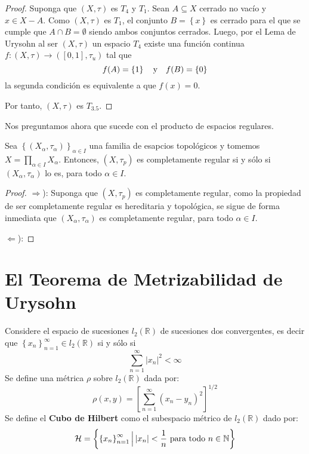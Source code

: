 \documentclass[12pt]{report}
\theoremstyle{largebreak}
\newcommand\abs[1]{\ensuremath{\left|#1\right|}}
\newcommand\cf[3]{\ensuremath{#1:#2\rightarrow#3}}
\begin{document}
    \begin{proof}
        Suponga que $(X,\tau)$ es $T_4$ y $T_1$. Sean $A\subseteq X$ cerrado no vacío y $x\in X-A$. Como $(X,\tau)$ es $T_1$, el conjunto $B=\left\{x \right\}$ es cerrado para el que se cumple que $A\cap B=\emptyset$ siendo ambos conjuntos cerrados. Luego, por el Lema de Urysohn al ser $(X,\tau)$ un espacio $T_4$ existe una función continua $\cf{f}{(X,\tau)}{([0,1],\tau_u)}$ tal que
        \begin{equation*}
            f(A)=\left\{1 \right\}\quad\textup{y}\quad f(B)=\left\{0 \right\}
        \end{equation*}
        la segunda condición es equivalente a que $f(x)=0$.

        Por tanto, $(X,\tau)$ es $T_{3.5}$.
    \end{proof}

    Nos preguntamos ahora que sucede con el producto de espacios regulares.

    \begin{propo}
        Sea $\left\{(X_\alpha,\tau_\alpha) \right\}_{ \alpha\in I}$ una familia de esapcios topológicos y tomemos $X=\prod_{ \alpha\in I}X_\alpha$. Entonces, $(X,\tau_p)$ es completamente regular si y sólo si $(X_\alpha,\tau_\alpha)$ lo es, para todo $\alpha\in I$.
    \end{propo}

    \begin{proof}
        $\Rightarrow$): Suponga que $(X,\tau_p)$ es completamente regular, como la propiedad de ser completamente regular es hereditaria y topológica, se sigue de forma inmediata que $(X_\alpha,\tau_\alpha)$ es completamente regular, para todo $\alpha\in I$.

        $\Leftarrow$): 
    \end{proof}

    \section{El Teorema de Metrizabilidad de Urysohn}

    \begin{mydef}
        Considere el espacio de sucesiones $l_2(\mathbb{R})$ de sucesiones dos convergentes, es decir que $\left\{x_n \right\}_{ n=1}^\infty\in l_2(\mathbb{R})$ si y sólo si
        \begin{equation*}
            \sum_{ n=1}^\infty\abs{x_n}^2<\infty
        \end{equation*}
        Se define una métrica $\rho$ sobre $l_2(\mathbb{R})$ dada por:
        \begin{equation*}
            \rho(x,y)=\left[\sum_{ n=1}^\infty(x_n-y_n)^2\right]^{1/2}
        \end{equation*}
        Se define el \textbf{Cubo de Hilbert} como el subespacio métrico de $l_2(\mathbb{R})$ dado por:
        \begin{equation*}
            \mathcal{H}=\left\{\left\{x_n \right\}_{ n=1}^\infty\Big|\abs{x_n}<\frac{1}{n}\textup{ para todo }n\in\mathbb{N} \right\}
        \end{equation*}
    \end{mydef}
\end{document}

